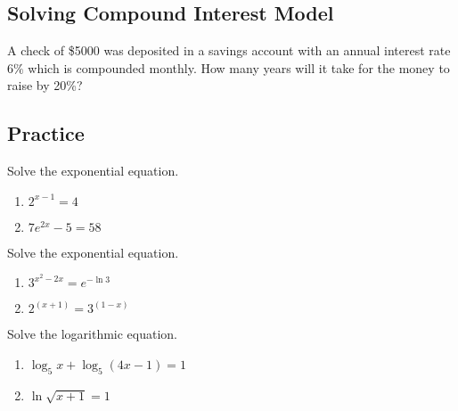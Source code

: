 \subsection{Solving Compound Interest
Model}

\begin{example}

A check of \$5000 was deposited in a savings account with an annual
interest rate \(6\%\) which is compounded monthly. How many years will
it take for the money to raise by 20\%?

\end{example}
\vspace*{6\baselineskip}

\subsection{Practice}

\begin{exercise}

Solve the exponential equation.

\begin{enumerate}
\item
  \(2^{x-1}=4\)
\item
  \(7e^{2x}-5=58\)
\end{enumerate}

\end{exercise}

\begin{exercise}

Solve the exponential equation.

\begin{enumerate}
\item
  \(3^{x^2-2x}=e^{-\ln3}\)
\item
  \(2^{(x+1)}=3^{(1-x)}\)
\end{enumerate}

\end{exercise}

\begin{exercise}

Solve the logarithmic equation.

\begin{enumerate}
\item
  \(\log_5x+\log_5(4x-1)=1\)
\item
  \(\ln \sqrt{x+1}=1\)
\end{enumerate}

\end{exercise}

